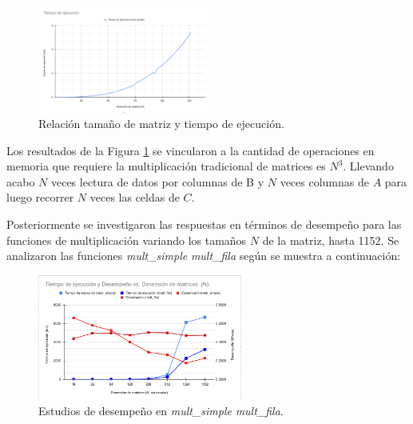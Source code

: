 \documentclass[11pt]{article}
\begin{document}
\begin{figure}[h]
\centering
\includegraphics[width=0.5\textwidth]{Ncubo.png}
\caption{Relación tamaño de matriz y tiempo de ejecución.}
\label{Fig:Ej2:Ncubo}
\end{figure}
\newpage
Los resultados de la Figura \ref{Fig:Ej2:Ncubo} se vincularon a la cantidad de operaciones en memoria que requiere la multiplicación tradicional  de matrices es $N^3$. Llevando acabo $N$ veces lectura de datos por columnas de B y $N$ veces columnas de $A$ para luego recorrer $N$ veces las celdas de $C$.

Posteriormente se investigaron las respuestas en términos de desempeño para las funciones de multiplicación variando los  tamaños $N$ de la matriz, hasta 1152. Se analizaron las funciones \emph{mult\_simple} \emph{mult\_fila} según se muestra a continuación:

\begin{figure}[h]
\centering
\includegraphics[width=0.6\textwidth]{tiempoYperformanceVSn.png}
\caption{Estudios de desempeño en \emph{mult\_simple} \emph{mult\_fila}.}
\label{Fig:Ej2:DesempenoMult}
\end{figure}
\end{document}
